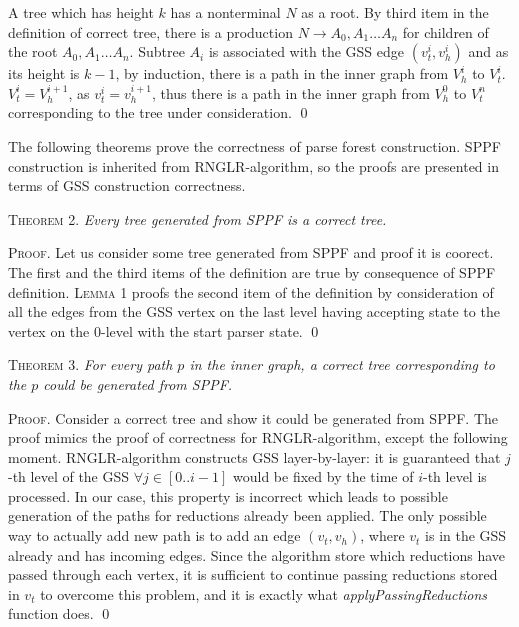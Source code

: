 A tree which has height $k$ has a nonterminal $N$ as a root. By third item in the definition of correct tree, 
there is a production $N \rightarrow A_{0}, A_{1} \dots A_{n}$ for children of the root $A_{0}, A_{1} \dots A_{n}$. 
Subtree $A_{i}$ is associated with the GSS edge $(v_{t}^{i}, v_{h}^{i})$ and as its height is $k-1$, by induction,
there is a path in the inner graph from $V_{h}^{i}$ to $V_{t}^{i}$. $V_{t}^i = V_{h}^{i+1}$, as $v_{t}^i = v_{h}^{i+1}$, 
thus there is a path in the inner graph from $V_{h}^{0}$ to $V_{t}^{n}$ corresponding to the tree under consideration.
\qed

The following theorems prove the correctness of parse forest construction. SPPF construction is inherited from 
RNGLR-algorithm, so the proofs are presented in terms of GSS construction correctness.


\textsc{Theorem 2.} 
\textit{Every tree generated from SPPF is a correct tree.}

\textsc{Proof.} Let us consider some tree generated from SPPF and proof it is coorect. 
The first and the third items of the definition are true by consequence of SPPF definition.
\textsc{Lemma 1} proofs the second item of the definition by consideration of all the edges from the GSS vertex
on the last level having accepting state to the vertex on the 0-level with the start parser state.
\qed

\textsc{Theorem 3.} 
\textit{For every path $p$ in the inner graph, a correct tree corresponding to the $p$ could be generated from SPPF.}

\textsc{Proof.}
Consider a correct tree and show it could be generated from SPPF. The proof mimics the proof of correctness for RNGLR-algorithm,
except the following moment. RNGLR-algorithm constructs GSS layer-by-layer: it is guaranteed that $j$-th level of the GSS 
$\forall j \in [0..i-1]$ would be fixed by the time of $i$-th level is processed. In our case, this property is incorrect 
which leads to possible generation of the paths for reductions already been applied. The only possible way to actually 
add new path is to add an edge $(v_{t}, v_{h})$, where $v_{t}$ is in the GSS already and has incoming edges.
Since the algorithm store which reductions have passed through each vertex, it is sufficient to continue passing 
reductions stored in $v_{t}$ to overcome this problem, and it is exactly what \emph{applyPassingReductions} function does. 
\qed